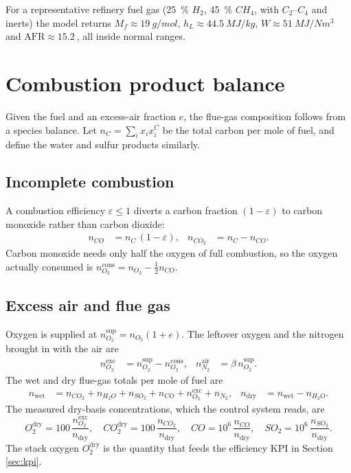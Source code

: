 \documentclass[11pt,a4paper]{article}
\begin{document}
For a representative refinery fuel gas (\SI{25}{\percent} $H_2$, \SI{45}{\percent}
$CH_4$, with $C_2$--$C_4$ and inerts) the model returns $M_f\approx\SI{19}{g/mol}$,
$h_L\approx\SI{44.5}{MJ/kg}$, $W\approx\SI{51}{MJ/Nm^3}$ and
$\mathrm{AFR}\approx\SI{15.2}{}$, all inside normal ranges.

\section{Combustion product balance}\label{sec:comb}

Given the fuel and an excess-air fraction $e$, the flue-gas composition follows
from a species balance. Let $n_C=\sum_i x_i x_i^{C}$ be the total carbon per mole
of fuel, and define the water and sulfur products similarly.

\subsection{Incomplete combustion}
A combustion efficiency $\varepsilon\le 1$ diverts a carbon fraction
$(1-\varepsilon)$ to carbon monoxide rather than carbon dioxide:
\begin{align}
n_{CO} &= n_C\,(1-\varepsilon), &
n_{CO_2} &= n_C - n_{CO}.
\end{align}
Carbon monoxide needs only half the oxygen of full combustion, so the oxygen
actually consumed is $n_{O_2}^\mathrm{cons}=n_{O_2}-\tfrac{1}{2}n_{CO}$.

\subsection{Excess air and flue gas}
Oxygen is supplied at $n_{O_2}^\mathrm{sup}=n_{O_2}(1+e)$. The leftover oxygen and
the nitrogen brought in with the air are
\begin{align}
n_{O_2}^\mathrm{exc} &= n_{O_2}^\mathrm{sup}-n_{O_2}^\mathrm{cons}, &
n_{N_2}^\mathrm{air} &= \beta\, n_{O_2}^\mathrm{sup}.
\end{align}
The wet and dry flue-gas totals per mole of fuel are
\begin{align}
n_\mathrm{wet} &= n_{CO_2}+n_{H_2O}+n_{SO_2}+n_{CO}+n_{O_2}^\mathrm{exc}+n_{N_2}, &
n_\mathrm{dry} &= n_\mathrm{wet}-n_{H_2O}.
\end{align}
The measured dry-basis concentrations, which the control system reads, are
\begin{equation}
O_2^\mathrm{dry}=100\,\frac{n_{O_2}^\mathrm{exc}}{n_\mathrm{dry}},\quad
CO_2^\mathrm{dry}=100\,\frac{n_{CO_2}}{n_\mathrm{dry}},\quad
CO=10^6\,\frac{n_{CO}}{n_\mathrm{dry}},\quad
SO_2=10^6\,\frac{n_{SO_2}}{n_\mathrm{dry}} .
\end{equation}
The stack oxygen $O_2^\mathrm{dry}$ is the quantity that feeds the efficiency KPI
in Section \ref{sec:kpi}.
\end{document}
